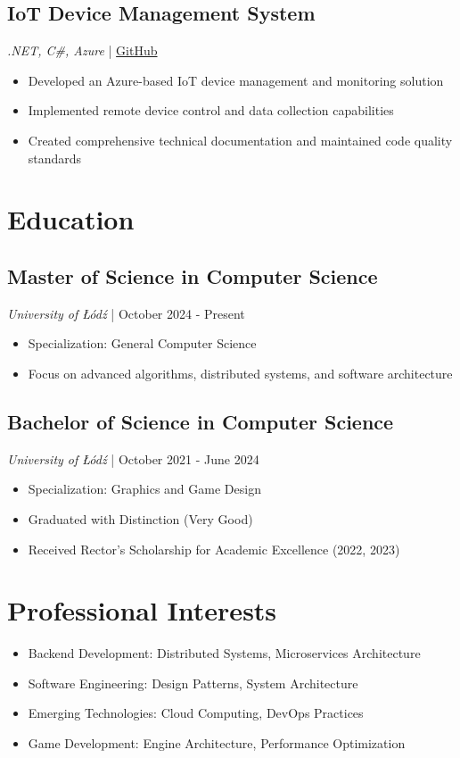 \documentclass[a4paper,10pt]{article}
\begin{document}
\subsection{IoT Device Management System}
\textit{.NET, C\#, Azure} | \href{https://github.com/ZDSDD/IoT_OpcAgent}{GitHub}
\begin{itemize}[leftmargin=0.5cm, nosep]
    \item Developed an Azure-based IoT device management and monitoring solution
    \item Implemented remote device control and data collection capabilities
    \item Created comprehensive technical documentation and maintained code quality standards
\end{itemize}

\section{Education}

\subsection{Master of Science in Computer Science}
\textit{University of Łódź} | October 2024 - Present
\begin{itemize}[leftmargin=0.5cm, nosep]
    \item Specialization: General Computer Science
    \item Focus on advanced algorithms, distributed systems, and software architecture
\end{itemize}

\subsection{Bachelor of Science in Computer Science}
\textit{University of Łódź} | October 2021 - June 2024
\begin{itemize}[leftmargin=0.5cm, nosep]
    \item Specialization: Graphics and Game Design
    \item Graduated with Distinction (Very Good)
    \item Received Rector's Scholarship for Academic Excellence (2022, 2023)
\end{itemize}

\section{Professional Interests}
\begin{itemize}[leftmargin=0.5cm, nosep]
    \item Backend Development: Distributed Systems, Microservices Architecture
    \item Software Engineering: Design Patterns, System Architecture
    \item Emerging Technologies: Cloud Computing, DevOps Practices
    \item Game Development: Engine Architecture, Performance Optimization
\end{itemize}
\end{document}

